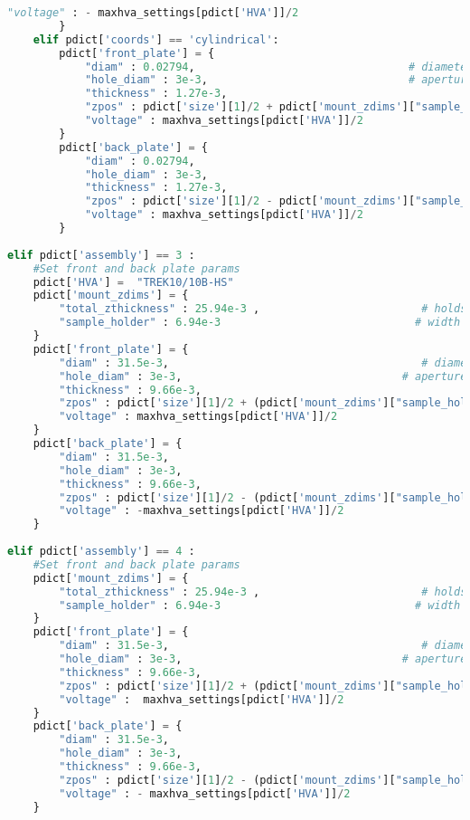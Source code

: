 \begin{lstlisting}[frame=single, language=Python]
            "voltage" : - maxhva_settings[pdict['HVA']]/2
        }
    elif pdict['coords'] == 'cylindrical':
        pdict['front_plate'] = {
            "diam" : 0.02794,                                 # diameter of plate [m]
            "hole_diam" : 3e-3,                               # aperture diameter [m]
            "thickness" : 1.27e-3, 
            "zpos" : pdict['size'][1]/2 + pdict['mount_zdims']["sample_holder"]/2,    # location of plate surface (com) [m]
            "voltage" : maxhva_settings[pdict['HVA']]/2                                  # Voltage on front plate [V]
        }
        pdict['back_plate'] = {
            "diam" : 0.02794,
            "hole_diam" : 3e-3,
            "thickness" : 1.27e-3, 
            "zpos" : pdict['size'][1]/2 - pdict['mount_zdims']["sample_holder"]/2,
            "voltage" : maxhva_settings[pdict['HVA']]/2  
        }
        
elif pdict['assembly'] == 3 :
    #Set front and back plate params
    pdict['HVA'] =  "TREK10/10B-HS"
    pdict['mount_zdims'] = {
        "total_zthickness" : 25.94e-3 ,                         # holds both sample and both electrodes [m]
        "sample_holder" : 6.94e-3                              # width of lip that separates sample from electrodes [m] 
    }
    pdict['front_plate'] = {
        "diam" : 31.5e-3,                                       # diameter of plate [m]
        "hole_diam" : 3e-3,                                  # aperture diameter [m]
        "thickness" : 9.66e-3, 
        "zpos" : pdict['size'][1]/2 + (pdict['mount_zdims']["sample_holder"]/2),      # location of plate surface (com) [m]
        "voltage" : maxhva_settings[pdict['HVA']]/2                                     # Voltage on front plate [V]
    }
    pdict['back_plate'] = {
        "diam" : 31.5e-3,
        "hole_diam" : 3e-3,
        "thickness" : 9.66e-3, 
        "zpos" : pdict['size'][1]/2 - (pdict['mount_zdims']["sample_holder"]/2),
        "voltage" : -maxhva_settings[pdict['HVA']]/2
    }
    
elif pdict['assembly'] == 4 :
    #Set front and back plate params
    pdict['mount_zdims'] = {
        "total_zthickness" : 25.94e-3 ,                         # holds both sample and both electrodes [m]
        "sample_holder" : 6.94e-3                              # width of lip that separates sample from electrodes [m] 
    }
    pdict['front_plate'] = {
        "diam" : 31.5e-3,                                       # diameter of plate [m]
        "hole_diam" : 3e-3,                                  # aperture diameter [m]
        "thickness" : 9.66e-3, 
        "zpos" : pdict['size'][1]/2 + (pdict['mount_zdims']["sample_holder"]/2),      # location of plate surface (com) [m]
        "voltage" :  maxhva_settings[pdict['HVA']]/2                                      # Voltage on front plate [V]
    }
    pdict['back_plate'] = {
        "diam" : 31.5e-3,
        "hole_diam" : 3e-3,
        "thickness" : 9.66e-3, 
        "zpos" : pdict['size'][1]/2 - (pdict['mount_zdims']["sample_holder"]/2),
        "voltage" : - maxhva_settings[pdict['HVA']]/2 
    }
    

\end{lstlisting}
